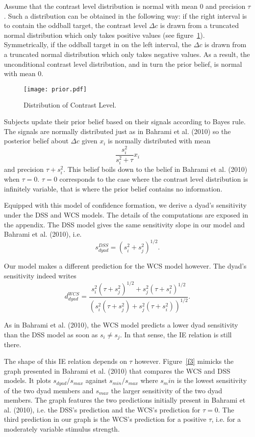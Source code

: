 \documentclass[12pt]{article}
\begin{document}
Assume that the contrast level distribution is normal with mean $0$ and precision $\tau$. Such a distribution can be obtained in the following way: if the right interval is to contain the oddball target, the contrast level $\Delta c$ is drawn from a truncated normal distribution which only takes positive values (see figure~\ref{f4}). Symmetrically, if the oddball target in on the left interval, the $\Delta c$ is drawn from a truncated normal distribution which only takes negative values. As a result, the unconditional contrast level distribution, and in turn the prior belief, is normal with mean 0. 
\begin{figure}[ht!] 
\centering
\texttt{[image: prior.pdf]}
\centering
\caption{Distribution of Contrast Level.}
\label{f4}
\end{figure}

Subjects update their prior belief based on their signals according to Bayes rule. The signals are normally distributed just as in Bahrami et al. (2010) so the posterior belief about $\Delta c$ given $x_i$ is normally distributed with mean $$ \frac{s_i^2}{s_i^2+\tau}x_i$$ and precision $\tau + s_i^2$. This belief boils down to the belief in Bahrami et al. (2010) when $\tau =0$. $\tau =0$ corresponds to the case where the contrast level distribution is infinitely variable, that is where the prior belief contains no information. 

Equipped with this model of confidence formation, we derive a dyad's sensitivity under the DSS and WCS models. The details of the computations are exposed in the appendix. The DSS model gives the same sensitivity slope in our model and Bahrami et al. (2010), i.e. $$ s_{dyad}^{DSS} = (s_i^2+s_j^2)^{1/2}. $$

Our model makes a different prediction for the WCS model however. The dyad's sensitivity indeed writes $$ d_{dyad}^{WCS} = \frac{s_i^2(\tau+s_j^2)^{1/2}+s_j^2(\tau+s_i^2)^{1/2}}{(s_i^2(\tau+s_j^2)+s_j^2(\tau+s_i^2))^{1/2}}.$$

As in Bahrami et al. (2010), the WCS model predicts a lower dyad sensitivity than the DSS model as soon as $s_i \neq s_j$. In that sense, the IE relation is still there. 

The shape of this IE relation depends on $\tau$ however. Figure~\ref{f3} mimicks the graph presented in Bahrami et al. (2010) that compares the WCS and DSS models. It plots $s_{dyad}/s_{max}$ against $s_{min}/s_{max}$ where $s_min$ is the lowest sensitivity of the two dyad members and $s_{max}$ the larger sensitivity of the two dyad members. The graph features the two predictions initially present in Bahrami et al. (2010), i.e. the DSS's prediction and the WCS's prediction for $\tau=0$. The third prediction in our graph is the WCS's prediction for a positive $\tau$, i.e. for a moderately variable stimulus strength. 
\end{document}
